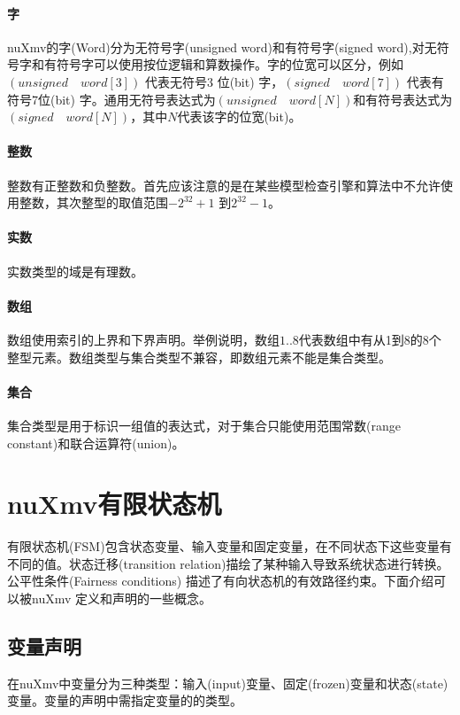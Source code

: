 \paragraph{字}
nuXmv的字(Word)分为无符号字(unsigned word)和有符号字(signed word),对无符号字和有符号字可以使用按位逻辑和算数操作。字的位宽可以区分，例如$\left(unsigned \quad word[3]\right)$ 代表无符号3 位(bit) 字，$\left(signed \quad word[7]\right)$ 代表有符号7位(bit) 字。通用无符号表达式为$\left(unsigned \quad word[N]\right)$和有符号表达式为$\left(signed \quad word[N]\right)$，其中$N$代表该字的位宽(bit)。

\paragraph{整数}
整数有正整数和负整数。首先应该注意的是在某些模型检查引擎和算法中不允许使用整数，其次整型的取值范围$-2^{32}+1$ 到$2^{32}-1$。

\paragraph{实数}
实数类型的域是有理数。

\paragraph{数组}
数组使用索引的上界和下界声明。举例说明，数组$1..8$代表数组中有从1到8的8个整型元素。数组类型与集合类型不兼容，即数组元素不能是集合类型。

\paragraph{集合}
集合类型是用于标识一组值的表达式，对于集合只能使用范围常数(range constant)和联合运算符(union)。

\section{nuXmv有限状态机}
有限状态机(FSM)包含状态变量、输入变量和固定变量，在不同状态下这些变量有不同的值。状态迁移(transition relation)描绘了某种输入导致系统状态进行转换。公平性条件(Fairness conditions) 描述了有向状态机的有效路径约束。下面介绍可以被nuXmv 定义和声明的一些概念。

\subsection{变量声明}
在nuXmv中变量分为三种类型：输入(input)变量、固定(frozen)变量和状态(state)变量。变量的声明中需指定变量的的类型。

